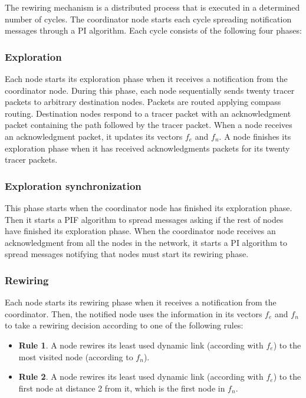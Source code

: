 The rewiring mechanism is a distributed process that is executed in a determined number of cycles. The coordinator node starts each cycle spreading notification messages through a PI algorithm. Each cycle consists of the following four phases:

\subsubsection{Exploration}

Each node starts its exploration phase when it receives a notification from the coordinator node. During this phase, each node sequentially sends twenty tracer packets to arbitrary destination nodes. Packets are routed applying compass routing. Destination nodes respond to a tracer packet with an acknowledgment packet containing the path followed by the tracer packet.
When a node receives an acknowledgment packet, it updates its vectors $f_e$ and $f_n$. A node finishes its exploration phase when it has received acknowledgments packets for its twenty tracer packets.

\subsubsection{Exploration synchronization}

This phase starts when the coordinator node has finished its exploration phase. Then it starts a PIF algorithm to spread messages asking if the rest of nodes have finished its exploration phase. When the coordinator node receives an acknowledgment from all the nodes in the network,  it starts a PI algorithm to spread messages notifying that nodes must start its rewiring phase.

\subsubsection{Rewiring}

Each node starts its rewiring phase when it receives a notification from the coordinator. Then, the notified node uses the information in its vectors $f_e$ and $f_n$ to take a rewiring decision according to one of the following rules:
\begin{itemize}
    \item \textbf{Rule 1}. A node rewires its least used dynamic link (according with $f_e$) to the most visited node (according to $f_n$).
    \item \textbf{Rule 2}. A node rewires its least used dynamic link (according with $f_e$) to the first node at distance 2 from it, which is the first node in $f_n$.
\end{itemize}

